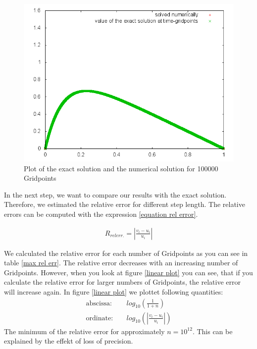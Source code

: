 \documentclass[10pt,a4paper]{article}
\begin{document}
\begin{figure}[h]
\centering
\includegraphics[scale=0.5]{Comparisonplot100000.png}
\caption{Plot of the exact solution and the numerical solution for 100000 Gridpoints}
\label{Comparison100000}
\end{figure}

In the next step, we want to compare our results with the exact solution. Therefore, we estimated the relative error for different step length. 
The relative errors can be computed with the expression \ref{equation rel error}. 

\begin{align}
R_{rel err.} = \left| \frac{v_i-u_i}{u_i} \right| \label{equation rel error}
\end{align}

We calculated the relative error for each number of Gridpoints as you can see in table \ref{max rel err}. The relative error decreases with an increasing number of Gridpoints. However, when you look at figure \ref{linear plot} you can see, that if you calculate the relative error for larger numbers of Gridpoints, the relative error will increase again.
In figure \ref{linear plot} we plottet following quantities:
\begin{align}
\mathrm{abscissa:} \quad &log_{10}\left(\frac{1}{1+n}\right) \\
\mathrm{ordinate:} \quad &log_{10} \left(\left| \frac{v_i-u_i}{u_i} \right| \right)
\end{align}
The minimum of the relative error  for approximately $n=10^{12}$. This can be explained by the effekt of loss of precision. 
\end{document}
